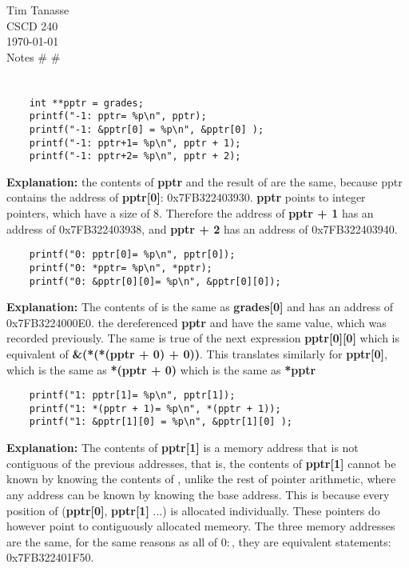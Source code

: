 \documentclass{article}
\begin{document}
\begin{flushright}
  Tim Tanasse\\
  CSCD 240\\
  \today \\
  Notes \# \# \\
\end{flushright}
\section*{}
\begin{lstlisting}
    int **pptr = grades;
    printf("-1: pptr= %p\n", pptr);
    printf("-1: &pptr[0] = %p\n", &pptr[0] );
    printf("-1: pptr+1= %p\n", pptr + 1);
    printf("-1: pptr+2= %p\n", pptr + 2);
\end{lstlisting}
\textbf{Explanation: }the contents of \textbf{pptr} and the result of  are the same, because pptr contains the address of \textbf{pptr[0]}: 0x7FB322403930. \textbf{pptr} points to integer pointers, which have a size of 8. Therefore the address of \textbf{pptr + 1} has an address of 0x7FB322403938, and \textbf{pptr + 2} has an address of 0x7FB322403940.
\begin{lstlisting}
    printf("0: pptr[0]= %p\n", pptr[0]);
    printf("0: *pptr= %p\n", *pptr);
    printf("0: &pptr[0][0]= %p\n", &pptr[0][0]);
\end{lstlisting}
\textbf{Explanation: }The contents of  is the same as \textbf{grades[0]} and has an address of 0x7FB3224000E0. the dereferenced \textbf{pptr} and  have the same value, which was recorded previously. The same is true of the next expression \textbf{pptr[0][0]} which is equivalent of \textbf{\&(*(*(pptr + 0) + 0))}. This translates similarly for \textbf{pptr[0]}, which is the same as \textbf{*(pptr + 0)} which is the same as \textbf{*pptr}
\begin{lstlisting}
    printf("1: pptr[1]= %p\n", pptr[1]);
    printf("1: *(pptr + 1)= %p\n", *(pptr + 1));
    printf("1: &pptr[1][0] = %p\n", &pptr[1][0] );
\end{lstlisting}
\textbf{Explanation: } The contents of \textbf{pptr[1]} is a memory address that is not contiguous of the previous addresses, that is, the contents of \textbf{pptr[1]} cannot be known by knowing the contents of , unlike the rest of pointer arithmetic, where any address can be known by knowing the base address. This is because every position of  (\textbf{pptr[0]}, \textbf{pptr[1]} ...) is allocated individually. These pointers do however point to contiguously allocated memeory. The three memory addresses are the same, for the same reasons as all of $0:$, they are equivalent statements: 0x7FB322401F50.
\end{document}
